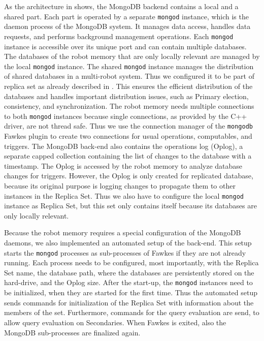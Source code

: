 As the architecture in  shows, the MongoDB backend
contains a local and a shared part. Each part is operated by a
separate \texttt{mongod} instance, which is the daemon process of the
MongoDB system. It manages data access, handles data requests, and
performs background management operations. Each \texttt{mongod}
instance is accessible over its unique port and can contain multiple
databases. The databases of the robot memory that are only locally
relevant are managed by the local \texttt{mongod} instance. The shared
\texttt{mongod} instance manages the distribution of shared databases
in a multi-robot system. Thus we configured it to be part of replica
set as already described in . This ensures the
efficient distribution of the databases and handles important
distribution issues, such as Primary election, consistency, and
synchronization.    The
robot memory needs multiple connections to both \texttt{mongod}
instances because single connections, as provided by the C++ driver,
are not thread safe. Thus we use the connection manager of the
\texttt{mongodb} Fawkes plugin to create two connections for usual
operations, computables, and triggers.
%
The MongoDB back-end also contains the operations log (Oplog), a
separate capped collection containing the list of changes to the
database with a timestamp. The Oplog is accessed by the robot memory
to analyze database changes for triggers. However, the Oplog is only
created for replicated database, because its original purpose is
logging changes to propagate them to other instances in the Replica
Set. Thus we also have to configure the local \texttt{mongod} instance
as Replica Set, but this set only contains itself because its
databases are only locally relevant.

Because the robot memory requires a special configuration of the
MongoDB daemons, we also implemented an automated setup of the
back-end. This setup starts the \texttt{mongod} processes as
sub-processes of Fawkes if they are not already running. Each process
needs to be configured, most importantly, with the Replica Set name,
the database path, where the databases are persistently stored on the
hard-drive, and the Oplog size. After the start-up, the \texttt{mongod}
instances need to be initialized, when they are started for the first
time. Thus the automated setup sends commands for initialization of
the Replica Set with information about the members of the
set. Furthermore, commands for the query evaluation are send, to allow
query evaluation on Secondaries.    When Fawkes is exited, also the
MongoDB sub-processes are finalized again.

